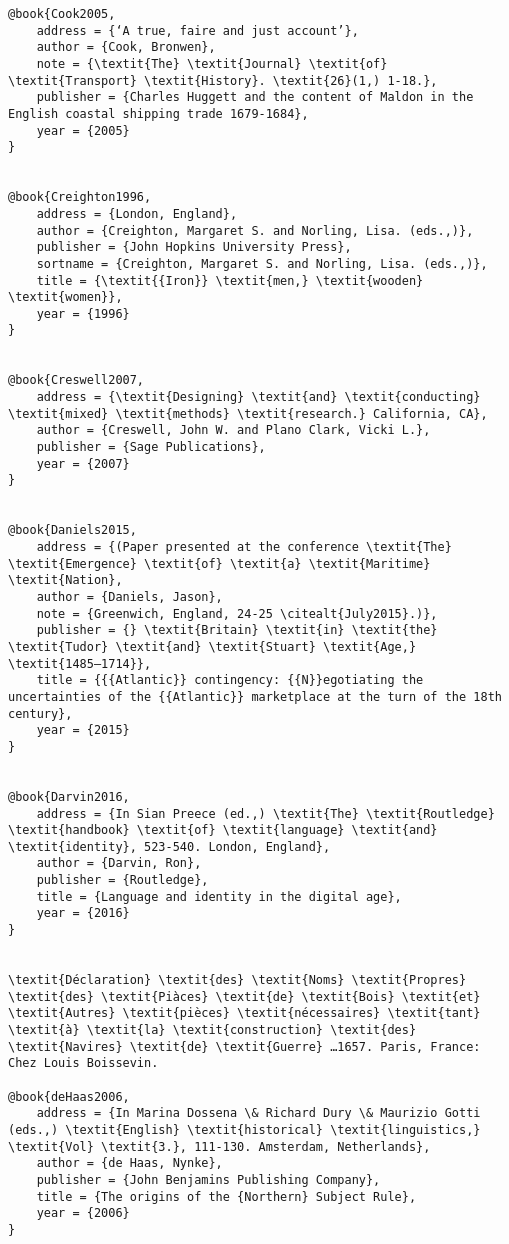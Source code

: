 \begin{verbatim}
@book{Cook2005,
	address = {‘A true, faire and just account’},
	author = {Cook, Bronwen},
	note = {\textit{The} \textit{Journal} \textit{of} \textit{Transport} \textit{History}. \textit{26}(1,) 1-18.},
	publisher = {Charles Huggett and the content of Maldon in the English coastal shipping trade 1679-1684},
	year = {2005}
}


@book{Creighton1996,
	address = {London, England},
	author = {Creighton, Margaret S. and Norling, Lisa. (eds.,)},
	publisher = {John Hopkins University Press},
	sortname = {Creighton, Margaret S. and Norling, Lisa. (eds.,)},
	title = {\textit{{Iron}} \textit{men,} \textit{wooden} \textit{women}},
	year = {1996}
}


@book{Creswell2007,
	address = {\textit{Designing} \textit{and} \textit{conducting} \textit{mixed} \textit{methods} \textit{research.} California, CA},
	author = {Creswell, John W. and Plano Clark, Vicki L.},
	publisher = {Sage Publications},
	year = {2007}
}


@book{Daniels2015,
	address = {(Paper presented at the conference \textit{The} \textit{Emergence} \textit{of} \textit{a} \textit{Maritime} \textit{Nation},
	author = {Daniels, Jason},
	note = {Greenwich, England, 24-25 \citealt{July2015}.)},
	publisher = {} \textit{Britain} \textit{in} \textit{the} \textit{Tudor} \textit{and} \textit{Stuart} \textit{Age,} \textit{1485–1714}},
	title = {{{Atlantic}} contingency: {{N}}egotiating the uncertainties of the {{Atlantic}} marketplace at the turn of the 18th century},
	year = {2015}
}


@book{Darvin2016,
	address = {In Sian Preece (ed.,) \textit{The} \textit{Routledge} \textit{handbook} \textit{of} \textit{language} \textit{and} \textit{identity}, 523-540. London, England},
	author = {Darvin, Ron},
	publisher = {Routledge},
	title = {Language and identity in the digital age},
	year = {2016}
}


\textit{Déclaration} \textit{des} \textit{Noms} \textit{Propres} \textit{des} \textit{Piàces} \textit{de} \textit{Bois} \textit{et} \textit{Autres} \textit{pièces} \textit{nécessaires} \textit{tant} \textit{à} \textit{la} \textit{construction} \textit{des} \textit{Navires} \textit{de} \textit{Guerre} …1657. Paris, France: Chez Louis Boissevin.

@book{deHaas2006,
	address = {In Marina Dossena \& Richard Dury \& Maurizio Gotti (eds.,) \textit{English} \textit{historical} \textit{linguistics,} \textit{Vol} \textit{3.}, 111-130. Amsterdam, Netherlands},
	author = {de Haas, Nynke},
	publisher = {John Benjamins Publishing Company},
	title = {The origins of the {Northern} Subject Rule},
	year = {2006}
}



\end{verbatim}
